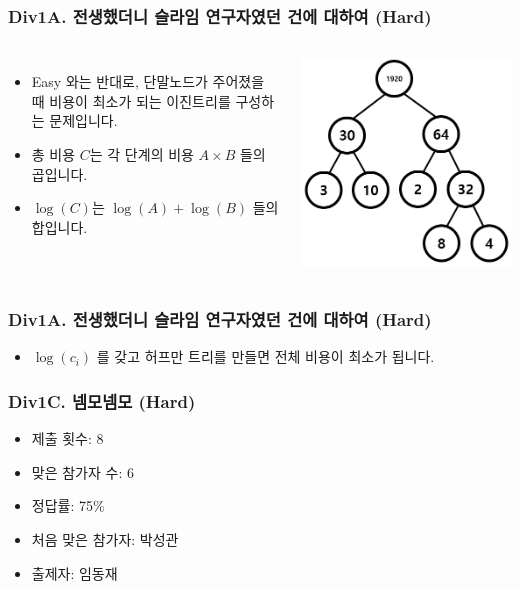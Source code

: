 \documentclass[xetex]{beamer}
\begin{document}
\begin{frame}
  \frametitle{Div1A. 전생했더니 슬라임 연구자였던 건에 대하여 (Hard)}
  \begin{columns}
      \begin{itemize}
        \item Easy 와는 반대로, 단말노드가 주어졌을 때 비용이 최소가 되는 이진트리를 구성하는 문제입니다.
        \item 총 비용 $C$는 각 단계의 비용 $A \times B$ 들의 곱입니다.
        \item $\log(C)$는 $\log(A) + \log(B)$ 들의 합입니다.
      \end{itemize}
      \includegraphics[width=1\textwidth]{slime2-sol-0.png}
  \end{columns}
\end{frame}

\begin{frame}
  \frametitle{Div1A. 전생했더니 슬라임 연구자였던 건에 대하여 (Hard)}
  \begin{itemize}
    \item $\log(c_i)$ 를 갖고 허프만 트리를 만들면 전체 비용이 최소가 됩니다.
  \end{itemize}
\end{frame}

\begin{frame}
  \frametitle{Div1C. 넴모넴모 (Hard)}
  \begin{itemize}
    \item 제출 횟수: 8
    \item 맞은 참가자 수: 6
    \item 정답률: 75\%
    \item 처음 맞은 참가자: 박성관
    \item 출제자: 임동재
  \end{itemize}
\end{frame}
\end{document}

